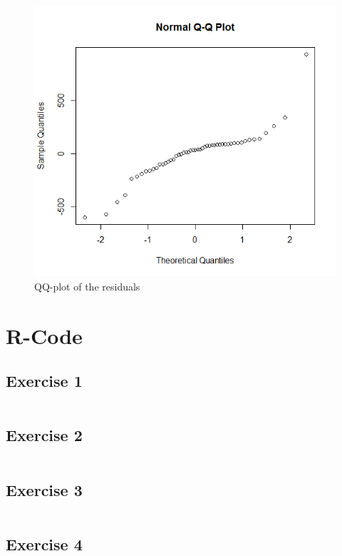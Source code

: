 \documentclass{article}
\begin{document}
    \begin{figure}
        \centering
        \includegraphics[scale=0.4]{../results/4_qq.png}
        \caption{QQ-plot of the residuals}
        \label{fig:4qq}
    \end{figure}
    
  \section{R-Code}
    \subsection{Exercise 1}\label{sec:RE1}
      \begin{lstlisting}[language=R]
      \end{lstlisting}
    \subsection{Exercise 2}\label{sec:RE2}
      \begin{lstlisting}[language=R]
      \end{lstlisting}
    \subsection{Exercise 3}\label{sec:RE3}
      \begin{lstlisting}[language=R]
      \end{lstlisting}
    \subsection{Exercise 4}\label{sec:RE4}
      \begin{lstlisting}[language=R]
      \end{lstlisting}
\end{document}
